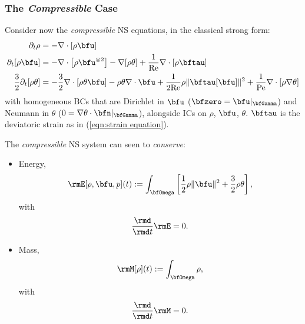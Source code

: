 \subsubsection*{The \emph{Compressible} Case}
    Consider now the \emph{compressible} NS equations, in the classical strong form:
    \begin{align}
                           \partial_{t}\rho  &=  - \nabla\cdot[\rho\bfu]  \label{eqn:compressible NS mass equation}  \\
                     \partial_{t}[\rho\bfu]  &=  - \nabla\cdot\left[\rho\bfu^{\otimes 2}\right] - \nabla[\rho\theta] + \frac{1}{\rmRe}\nabla\cdot[\rho\bftau]  \label{eqn:compressible NS momentum equation}  \\
        \frac{3}{2}\partial_{t}[\rho\theta]  &=  - \frac{3}{2}\nabla\cdot[\rho\theta\bfu] - \rho\theta\nabla\cdot\bfu + \frac{1}{2\rmRe}\rho\|\bftau[\bfu]\|^{2} + \frac{1}{\rmPe}\nabla\cdot[\rho\nabla\theta]  \label{eqn:compressible NS energy equation}
    \end{align}
    with homogeneous BCs that are Dirichlet in $\bfu$ ($\bfzero  =  \bfu|_{\bfGamma}$) and Neumann in $\theta$ ($0  =  \nabla\theta\cdot\bfn|_{\bfGamma}$), alongside ICs on $\rho$, $\bfu$, $\theta$. $\bftau$ is the deviatoric strain as in (\ref{eqn:strain equation}).

    The \emph{compressible} NS system can seen to \emph{conserve}:
    \begin{itemize}
        \item  Energy,
        \begin{equation}\label{eqn:compressible NS energy definition}
            \rmE[\rho, \bfu, p](t)  :=  \int_{\bfOmega}\left[\frac{1}{2}\rho\|\bfu\|^{2} + \frac{3}{2}\rho\theta\right],
        \end{equation}
        with
        \begin{equation}
            \frac{\rmd}{\rmd t}\rmE  =  0.
        \end{equation}
        \item  Mass,
        \begin{equation}\label{eqn:compressible NS mass definition}
            \rmM[\rho](t)  :=  \int_{\bfOmega}\rho,
        \end{equation}
        with
        \begin{equation}
            \frac{\rmd}{\rmd t}\rmM  =  0.
        \end{equation}
    \end{itemize}

